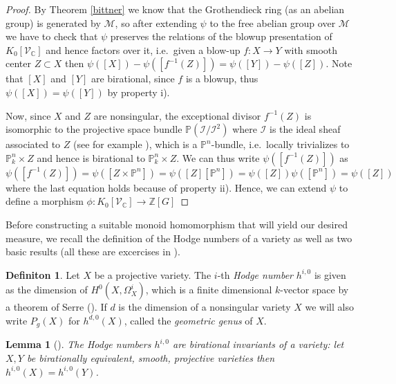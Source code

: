 \documentclass[11pt, a4paper, german]{article}
\theoremstyle{plain}
\newtheorem{lemma}[theorem]{Lemma}
\theoremstyle{definition}
\newtheorem{definition}[theorem]{Definiton}
\newcommand{\gring}[1][k]{K_0[\mathcal{V}_#1]}
\begin{document}
\begin{proof}
    By Theorem \ref{bittner} we know that the Grothendieck ring (as an abelian group) is generated by $\mathcal{M}$, so after extending $\psi$ to
    the free abelian group over $\mathcal{M}$ 
    we have to check that $\psi$ preserves the relations of the blowup presentation of $\gring[\mathbb{C}]$ and hence factors over it,
    i.e.\ given a blow-up $f \colon X \to Y$ with smooth center $Z \subset X$ then $\psi([X]) - \psi([f^{-1}(Z)]) = \psi([Y]) - \psi([Z])$. 
    Note that $[X]$ and $[Y]$ are birational, since $f$ is a blowup, thus $\psi([X]) = \psi([Y])$ by property i).
    
    Now, since $X$ and $Z$ are nonsingular, the exceptional divisor $f^{-1}(Z)$ is isomorphic to 
    the projective space bundle  $\mathbb{P}(\mathcal{I}/\mathcal{I}^2)$ 
    where $\mathcal{I}$ is the ideal sheaf associated to $Z$ (see for example \cite[II.8, Thm 8.24]{Ha}),
    which is a $\mathbb{P}^n$-bundle, i.e.\ locally trivializes to $\mathbb{P}_k^n \times Z$
    and hence is birational to $\mathbb{P}_k^n \times Z$. 
    We can thus write $\psi([f^{-1}(Z)])$ as  
    \[
        \psi([f^{-1}(Z)]) = \psi([Z \times \mathbb{P}^n]) = \psi([Z][\mathbb{P}^n]) = \psi([Z])\psi([\mathbb{P}^n]) = \psi([Z])
    \]
    where the last equation holds because of property ii).
    Hence, we can extend $\psi$ to define a morphism $\phi \colon \gring[\mathbb{C}] \to \mathbb{Z} [G]$
\end{proof}

Before constructing a suitable monoid homomorphism that will yield our desired measure, we recall the definition of the Hodge numbers
of a variety as well as two basic results (all these are excercises in \cite[Ch. II]{Ha}).

\begin{definition}
    Let $X$ be a projective variety. The $i$-th \emph{Hodge number} $h^{i,0}$ is given as the dimension of $H^0(X,\Omega^i_X)$, 
    which is a finite dimensional $k$-vector space by a theorem of Serre (\cite[§3 Prop. 7]{FAC}).
    If $d$ is the dimension of a nonsingular variety $X$ we will also write $P_g(X)$ for $h^{d,0}(X)$, called the \emph{geometric genus} of $X$.
\end{definition}

\begin{lemma}[{\cite[II Ex. 8.8]{Ha}}]
    \label{bir}
    The Hodge numbers $h^{i,0}$ are birational invariants of a variety: let $X, Y$ be birationally equivalent, smooth, projective varieties
    then $h^{i,0}(X) = h^{i,0}(Y)$.
\end{lemma}
\end{document}
